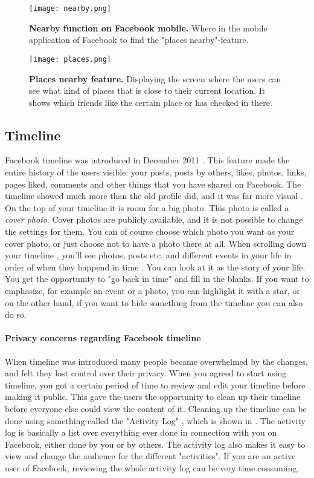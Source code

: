 \begin{figure}[h!]
\centering
\texttt{[image: nearby.png]}
\caption[Nearby function on Facebook mobile]{\textbf{Nearby function on Facebook mobile.}  Where in the mobile application of Facebook to find the "places nearby"-feature.  } 
\label{fig:nearby}
\end{figure}

\begin{figure}[h!]
\centering
\texttt{[image: places.png]}
\caption [Places nearby feature]{\textbf{Places nearby feature.} Displaying the screen where the users can see what kind of places that is close to their current location. It shows which friends like the certain place or has checked in there.} 
\label{fig:places}
\end{figure}

\subsection{Timeline}
Facebook timeline was introduced in December 2011 \cite{EvolutionOfFacebook}. This feature made the entire history of the users visible: your posts, posts by others, likes, photos, links, pages liked, comments and other things that you have shared on Facebook. The timeline showed much more than the old profile did, and it was far more visual \cite{timeline}. On the top of your timeline it is room for a big photo. This photo is called a \emph{cover photo}. Cover photos are publicly available, and it is not possible to change the settings for them. You can of course choose which photo you want as your cover photo, or just choose not to have a photo there at all. When scrolling down your timeline , you'll see photos, posts etc. and different events in your life in order of when they happend in time \cite{timeline}. You can look at it as the story of your life. You get the opportunity to "go back in time" and fill in the blanks. If you want to emphasize, for example an event or a photo, you can highlight it with a star, or on the other hand, if you want to hide something from the timeline you can also do so. 

\paragraph{Privacy concerns regarding Facebook timeline}
When timeline was introduced many people became overwhelmed by the changes, and felt they lost control over their privacy. When you agreed to start using timeline, you got a certain period of time to review and edit your timeline before making it public. This gave the users the opportunity to clean up their timeline before everyone else could view the content of it. Cleaning up the timeline can be done using something called the "Activity Log" \cite{activitylog}, which is shown in . The activity log is basically a list over everything ever done in connection with you on Facebook, either done by you or by others. The activity log also makes it easy to view and change the audience for the different "activities". If you are an active user of Facebook, reviewing the whole activity log can be very time consuming. 

